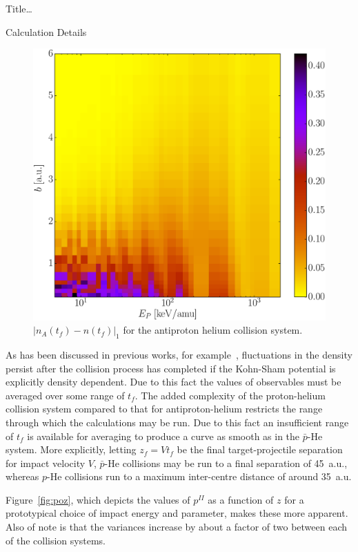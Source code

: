 \documentclass[letterpaper, 11 pt]{report}
\begin{document}
\begin{chapter}{ Title\dots \label{chap:p-he2p-he}}
\begin{section}{Calculation Details \label{sec:phe2p-det}}
\begin{figure}[t]
\begin{minipage}{.49\linewidth}
            \centering
            \includegraphics[width = \linewidth]{./images/dendiff.eps}
            \caption[Density difference]
                   {$\left| n_A(t_f) - n (t_f)\right|_1$ for the antiproton
                    helium collision system. \label{fig:l1}}
         \end{minipage}
      \end{figure}

      As has been discussed in previous works, for example~\cite{microresp,pbarhe}, fluctuations in the
      density persist after the collision process has completed if the Kohn-Sham potential is explicitly
      density dependent. Due to this fact the values of observables must be averaged over some range of
      $t_f$. The added complexity of the proton-helium collision system compared to that for
      antiproton-helium restricts the range through which the calculations may be run. Due to this fact
      an insufficient range of $t_f$ is available for averaging to produce a curve as smooth as in the
      $\bar{p}$-He system. More explicitly, letting $z_f = V t_f$ be the final target-projectile
      separation for impact velocity $V$, $\bar{p}$-He collisions may be run to a final separation of
      45~a.u., whereas $p$-He collisions run to a maximum inter-centre distance of around 35~a.u.
      
      Figure~\ref{fig:poz}, which depicts the values of $p^{II}$ as a function of $z$ for a prototypical
      choice of impact energy and parameter, makes these more apparent. Also of note is that the
      variances increase by about a factor of two between each of the collision systems.


\end{section}
\end{chapter}
\end{document}

